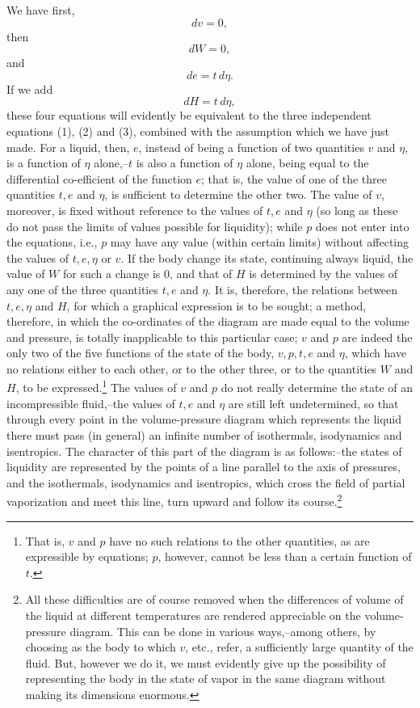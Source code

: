 \documentclass[11pt]{article}
\begin{document}
We have first,
\[
dv=0,
\]
then
\[
dW=0,
\]
and
\[
de=t\,d\eta.
\]
If we add
\[
dH=t\,d\eta,
\]
these four equations will evidently be equivalent to the three independent equations (1), (2) and (3), combined with the assumption which we have just made. For a liquid, then, $e$, instead of being a function of two quantities $v$ and $\eta$, is a function of $\eta$ alone,--$t$ is also a function of $\eta$ alone, being equal to the differential co-efficient of the function $e$; that is, the value of one of the three quantities $t,e$ and $\eta$, is sufficient to determine the other two. The value of $v$, moreover, is fixed without reference to the values of $t,e$ and $\eta$ (so long as these do not pass the limits of values possible for liquidity); while $p$ does not enter into the equations, i.e., $p$ may have any value (within certain limits) without affecting the values of $t,e,\eta$ or $v$. If the body change its state, continuing always liquid, the value of $W$ for such a change is 0, and that of $H$ is determined by the values of any one of the three quantities $t,e$ and $\eta$. It is, therefore, the relations between $t,e,\eta$ and $H$, for which a graphical expression is to be sought; a method, therefore, in which the co-ordinates of the diagram are made equal to the volume and pressure, is totally inapplicable to this particular case; $v$ and $p$ are indeed the only two of the five functions of the state of the body, $v,p,t,e$ and $\eta$, which have no relations either to each other, or to the other three, or to the quantities $W$ and $H$, to be expressed.\footnote{That is, $v$ and $p$ have no such relations to the other quantities, as are expressible by equations; $p$, however, cannot be less than a certain function of $t$.} The values of $v$ and $p$ do not really determine the state of an incompressible fluid,--the values of $t,e$ and $\eta$ are still left undetermined, so that through every point in the volume-pressure diagram which represents the liquid there must pass (in general) an infinite number of isothermals, isodynamics and isentropics. The character of this part of the diagram is as follows:--the states of liquidity are represented by the points of a line parallel to the axis of pressures, and the isothermals, isodynamics and isentropics, which cross the field of partial vaporization and meet this line, turn upward and follow its course.\footnote{All these difficulties are of course removed when the differences of volume of the liquid at different temperatures are rendered appreciable on the volume-pressure diagram. This can be done in various ways,--among others, by choosing as the body to which $v$, etc., refer, a sufficiently large quantity of the fluid. But, however we do it, we must evidently give up the possibility of representing the body in the state of vapor in the same diagram without making its dimensions enormous.}
\end{document}
